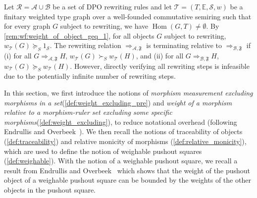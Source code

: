 Let \( \mathcal{R} = \mathcal{A} \cup \mathcal{B} \) be a set of DPO rewriting rules and let $\mathcal{T}=(T,\mathbb{E},\mathcal{S},w)$ be a finitary weighted type graph over a well-founded commutative semiring such that for every graph $G$ subject to rewriting, we have $\operatorname{Hom}(G,T)\neq \emptyset$. By \autoref{rem:wf:weight_of_object_geq_1}, for all objects \( G \) subject to rewriting, \(w_\mathcal{T}(G) \succeq_S 1_\mathcal{S} \).
The rewriting relation \( \Rightarrow_{\mathcal{A},\mathfrak{F}} \) is terminating relative to $\Rightarrow_{\mathcal{B},\mathfrak{F}}$ if (i) for all \(G \Rightarrow_{\mathcal{A},\mathfrak{F}} H\), \( w_\mathcal{T}(G) \succ_S w_\mathcal{T}(H)\), and (ii) for all \(G \Rightarrow_{\mathcal{B},\mathfrak{F}} H\), \( w_\mathcal{T}(G) \succeq_S w_\mathcal{T}(H) \). However, directly verifying all rewriting steps is infeasible due to the potentially infinite number of rewriting steps.

In this section, we first introduce the notions of \emph{morphism measurement excluding morphisms in a set}(\autoref{def:weight_excluding_pre}) and \emph{weight of a morphism relative to a morphism-ruler set excluding some specific morphisms}(\autoref{def:weight_excluding}),
to reduce notational overhead (following Endrullis and Overbeek~\cite{endrullis2024generalized_icgt}).
We then recall the notions of traceability of objects (\autoref{def:traceability}) and relative monicity of morphisms (\autoref{def:relative_monicity}),
which are used to define the notion of weighable pushout squares (\autoref{def:weighable}). With the notion of a weighable pushout square, we recall a result from Endrullis and Overbeek~\cite{endrullis2024generalized_icgt} which shows that the weight of the pushout object of a weighable pushout square can be bounded by the weights of the other objects in the pushout square.

